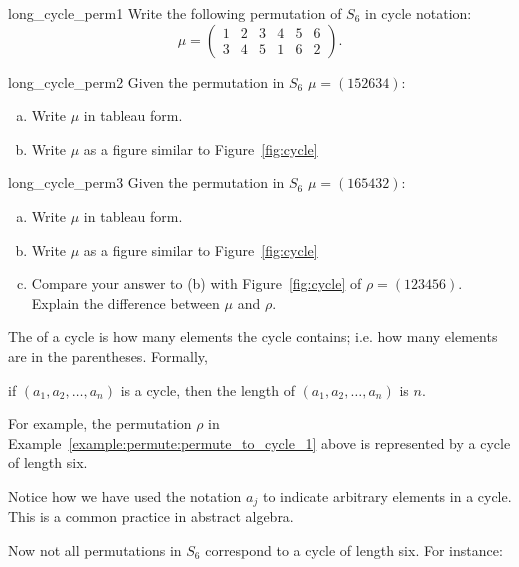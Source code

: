\begin{exercise}{long_cycle_perm1}
Write the following permutation of $S_6$ in cycle notation:  
\[ \mu = \begin{pmatrix} 1 & 2 & 3 & 4 & 5 & 6 \\ 3 & 4 & 5 & 1 & 6 & 2 \end{pmatrix}. \]
\end{exercise}

\begin{exercise}{long_cycle_perm2}
Given the permutation in $S_6$ $\mu = (152634)$:
\begin{enumerate}[(a)]
\item
Write $\mu$ in tableau form.
\item
Write $\mu$ as a figure similar to Figure~\ref{fig:cycle}
\end{enumerate}
\end{exercise}

\begin{exercise}{long_cycle_perm3}
Given the permutation in $S_6$ $\mu = (165432)$:
\begin{enumerate}[(a)]
\item
Write $\mu$ in tableau form.
\item
Write $\mu$ as a figure similar to Figure~\ref{fig:cycle}
\item
Compare your answer to (b) with Figure~\ref{fig:cycle} of $\rho = (123456)$.  Explain the difference between $\mu$ and $\rho$. 
\end{enumerate}
\end{exercise}

\begin{defn} \label{cycle_length}
The  of a cycle is how many elements the cycle contains; i.e. how many elements are in the parentheses.  Formally, 
\begin{center}
if $(a_1, a_2, \ldots, a_n)$ is a cycle, then the length of $(a_1, a_2, \ldots, a_n)$ is $n$.
\end{center}
\end{defn}
For example, the permutation $\rho$ in Example~\ref{example:permute:permute_to_cycle_1} above is represented by a cycle of length six.

\begin{rem}
Notice how we have used the notation $a_j$ to indicate arbitrary elements in a cycle.  This is a common practice in abstract algebra.
\end{rem}

Now not all permutations in $S_6$ correspond to a cycle of length six.  For instance:

